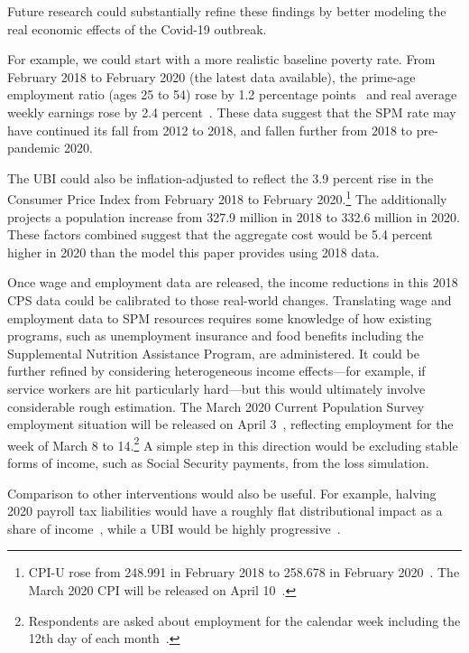 \documentclass[12pt]{article}
\begin{document}
Future research could substantially refine these findings by better modeling the real economic effects of the Covid-19 outbreak.

For example, we could start with a more realistic baseline poverty rate. From February 2018 to February 2020 (the latest data available), the prime-age employment ratio (ages 25 to 54) rose by 1.2 percentage points~\cite{fred_paepop} and real average weekly earnings rose by 2.4 percent~\cite{bls_earnings}. These data suggest that the SPM rate may have continued its fall from 2012 to 2018, and fallen further from 2018 to pre-pandemic 2020.

The UBI could also be inflation-adjusted to reflect the 3.9 percent rise in the Consumer Price Index from February 2018 to February 2020.\footnote{CPI-U rose from 248.991 in February 2018 to 258.678 in February 2020~\cite{bls_cpi_data}. The March 2020 CPI will be released on April 10~\cite{bls_cpi_releases}.} The  additionally projects a population increase from 327.9 million in 2018 to 332.6 million in 2020. These factors combined suggest that the aggregate cost would be 5.4 percent higher in 2020 than the model this paper provides using 2018 data.

Once wage and employment data are released, the income reductions in this 2018 CPS data could be calibrated to those real-world changes. Translating wage and employment data to SPM resources requires some knowledge of how existing programs, such as unemployment insurance and food benefits including the Supplemental Nutrition Assistance Program, are administered. It could be further refined by considering heterogeneous income effects---for example, if service workers are hit particularly hard---but this would ultimately involve considerable rough estimation. The March 2020 Current Population Survey employment situation will be released on April 3~\cite{bls_releases}, reflecting employment for the week of March 8 to 14.\footnote{Respondents are asked about employment for the calendar week including the 12th day of each month~\cite{bls_cps_faq}.} A simple step in this direction would be excluding stable forms of income, such as Social Security payments, from the loss simulation.

Comparison to other interventions would also be useful. For example, halving 2020 payroll tax liabilities would have a roughly flat distributional impact as a share of income~\cite{taxbrain}, while a UBI would be highly progressive~\cite{ghenis_yang}.
\end{document}
